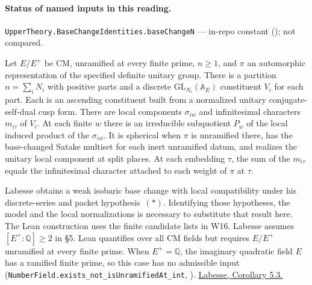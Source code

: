 

\paragraph{Status of named inputs in this reading.}
\noindent\nolinkurl{UpperTheory.BaseChangeIdentities.baseChangeN} --- in-repo constant (); not compared.\par

\begin{formalstatement}\label{sub:W02}
Let $E/E^+$ be CM, unramified at every finite prime, $n\ge1$, and $\pi$
an automorphic representation of the specified definite unitary group.
There is a partition $n=\sum_i N_i$ with positive parts and a discrete
$\mathrm{GL}_{N_i}(\mathbb A_E)$ constituent $V_i$ for each part.
Each is an ascending constituent built from a normalized unitary
conjugate-self-dual cusp form. There are local components $\sigma_{iw}$
and infinitesimal characters $m_{i\tau}$ of $V_i$. At each finite $w$
there is an irreducible subquotient $P_w$ of the local induced product
of the $\sigma_{iw}$. It is spherical when $\pi$ is unramified there,
has the base-changed Satake multiset for each inert unramified datum,
and realizes the unitary local component at split places. At each
embedding $\tau$, the sum of the $m_{i\tau}$ equals the infinitesimal
character attached to each weight of $\pi$ at $\tau$.
\end{formalstatement}
Labesse obtains a weak isobaric base change with local compatibility
under his discrete-series and packet hypothesis~$(*)$. Identifying those
hypotheses, the model and the local normalizations is necessary to
substitute that result here. The Lean construction uses the finite
candidate lists in W16. Labesse assumes $[E^+:\mathbb Q]\ge2$ in \S5. Lean quantifies over all CM fields but requires $E/E^+$ unramified at every finite prime. When $E^+=\mathbb Q$, the imaginary quadratic field $E$ has a ramified finite prime, so this case has no admissible input (\nolinkurl{NumberField.exists_not_isUnramifiedAt_int}, ).
\href{https://webusers.imj-prg.fr/~michael.harris/CBCM.pdf}{Labesse, Corollary 5.3.}~\cite{r21-labesse}
